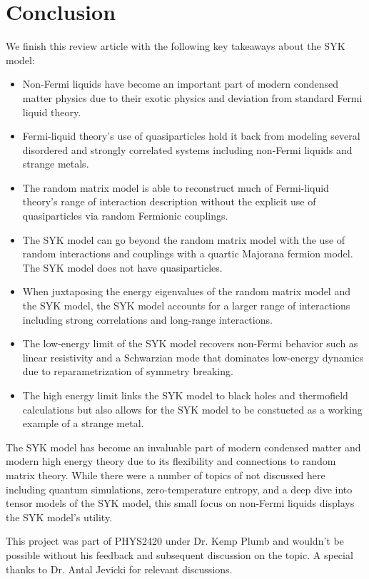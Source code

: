 \documentclass[reprint]{revtex4-2}
\begin{document}
\section{Conclusion}
We finish this review article with the following key takeaways about the SYK model: 
\begin{itemize}
    \item Non-Fermi liquids have become an important part of modern condensed matter physics due to their exotic physics and deviation from standard Fermi liquid theory. 
    \item Fermi-liquid theory's use of quasiparticles hold it back from modeling several disordered and strongly correlated systems including non-Fermi liquids and strange metals.
    \item The random matrix model is able to reconstruct much of Fermi-liquid theory's range of interaction description without the explicit use of quasiparticles via random Fermionic couplings.
    \item The SYK model can go beyond the random matrix model with the use of random interactions and couplings with a quartic Majorana fermion model. The SYK model does not have quasiparticles.
    \item When juxtaposing the energy eigenvalues of the random matrix model and the SYK model, the SYK model accounts for a larger range of interactions including strong correlations and long-range interactions. 
    \item The low-energy limit of the SYK model recovers non-Fermi behavior such as linear resistivity and a Schwarzian mode that dominates low-energy dynamics due to reparametrization of symmetry breaking. 
    \item The high energy limit links the SYK model to black holes and thermofield calculations but also allows for the SYK model to be constucted as a working example of a strange metal.
\end{itemize}
The SYK model has become an invaluable part of modern condensed matter and modern high energy theory due to its flexibility and connections to random matrix theory. While there were a number of topics of not discussed here including quantum simulations, zero-temperature entropy, and a deep dive into tensor models of the SYK model, this small focus on non-Fermi liquids displays the SYK model's utility. 
\begin{acknowledgments}
This project was part of PHYS2420 under Dr. Kemp Plumb and wouldn't be possible without his feedback and subsequent discussion on the topic. A special thanks to Dr. Antal Jevicki for relevant discussions. 

\end{acknowledgments}




\end{document}
